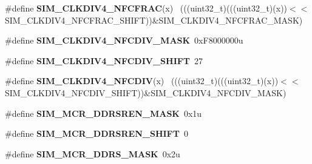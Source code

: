 \begin{DoxyCompactItemize}
\item 
\hypertarget{group___s_i_m___register___masks_ga9ce094f5699f1a6993fb3a517615ecaf}{}\#define {\bfseries S\+I\+M\+\_\+\+C\+L\+K\+D\+I\+V4\+\_\+\+N\+F\+C\+F\+R\+A\+C}(x)                                  ~(((uint32\+\_\+t)(((uint32\+\_\+t)(x))$<$$<$S\+I\+M\+\_\+\+C\+L\+K\+D\+I\+V4\+\_\+\+N\+F\+C\+F\+R\+A\+C\+\_\+\+S\+H\+I\+F\+T))\&S\+I\+M\+\_\+\+C\+L\+K\+D\+I\+V4\+\_\+\+N\+F\+C\+F\+R\+A\+C\+\_\+\+M\+A\+S\+K)\label{group___s_i_m___register___masks_ga9ce094f5699f1a6993fb3a517615ecaf}

\item 
\hypertarget{group___s_i_m___register___masks_gad89c98f2113f1bd031da995433f6c16b}{}\#define {\bfseries S\+I\+M\+\_\+\+C\+L\+K\+D\+I\+V4\+\_\+\+N\+F\+C\+D\+I\+V\+\_\+\+M\+A\+S\+K}~0x\+F8000000u\label{group___s_i_m___register___masks_gad89c98f2113f1bd031da995433f6c16b}

\item 
\hypertarget{group___s_i_m___register___masks_ga1fde2b03566f7185bcee5165da2d0cbd}{}\#define {\bfseries S\+I\+M\+\_\+\+C\+L\+K\+D\+I\+V4\+\_\+\+N\+F\+C\+D\+I\+V\+\_\+\+S\+H\+I\+F\+T}~27\label{group___s_i_m___register___masks_ga1fde2b03566f7185bcee5165da2d0cbd}

\item 
\hypertarget{group___s_i_m___register___masks_ga4dcde8501ce0026ba0ad8d5ac03f61d4}{}\#define {\bfseries S\+I\+M\+\_\+\+C\+L\+K\+D\+I\+V4\+\_\+\+N\+F\+C\+D\+I\+V}(x)                                    ~(((uint32\+\_\+t)(((uint32\+\_\+t)(x))$<$$<$S\+I\+M\+\_\+\+C\+L\+K\+D\+I\+V4\+\_\+\+N\+F\+C\+D\+I\+V\+\_\+\+S\+H\+I\+F\+T))\&S\+I\+M\+\_\+\+C\+L\+K\+D\+I\+V4\+\_\+\+N\+F\+C\+D\+I\+V\+\_\+\+M\+A\+S\+K)\label{group___s_i_m___register___masks_ga4dcde8501ce0026ba0ad8d5ac03f61d4}

\item 
\hypertarget{group___s_i_m___register___masks_ga620b56c6106039509486d8174f5f40fb}{}\#define {\bfseries S\+I\+M\+\_\+\+M\+C\+R\+\_\+\+D\+D\+R\+S\+R\+E\+N\+\_\+\+M\+A\+S\+K}~0x1u\label{group___s_i_m___register___masks_ga620b56c6106039509486d8174f5f40fb}

\item 
\hypertarget{group___s_i_m___register___masks_ga0c20ac3043281730c2992c569756e797}{}\#define {\bfseries S\+I\+M\+\_\+\+M\+C\+R\+\_\+\+D\+D\+R\+S\+R\+E\+N\+\_\+\+S\+H\+I\+F\+T}~0\label{group___s_i_m___register___masks_ga0c20ac3043281730c2992c569756e797}

\item 
\hypertarget{group___s_i_m___register___masks_ga9d423232530ca66a51bf8141a2ccb90a}{}\#define {\bfseries S\+I\+M\+\_\+\+M\+C\+R\+\_\+\+D\+D\+R\+S\+\_\+\+M\+A\+S\+K}~0x2u\label{group___s_i_m___register___masks_ga9d423232530ca66a51bf8141a2ccb90a}


\end{DoxyCompactItemize}
